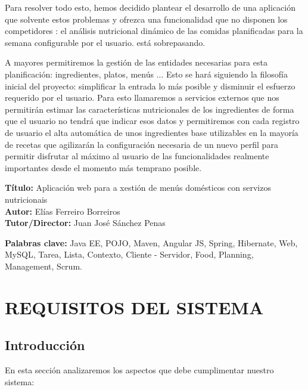 \documentclass[12pt, a4paper, twoside]{book}
\begin{document}
	Para resolver todo esto, hemos decidido plantear el desarrollo de una aplicación que solvente estos problemas y ofrezca una funcionalidad que no disponen los competidores : el análisis nutricional dinámico de las comidas planificadas para la semana configurable por el usuario. está sobrepasando.
	
	A mayores permitiremos la gestión de las entidades necesarias para esta planificación: ingredientes, platos, menús ... 
	Esto se hará siguiendo la filosofía inicial del proyecto: simplificar la entrada lo más posible y disminuir el esfuerzo requerido por el usuario. 
	Para esto llamaremos a servicios externos que nos permitirán estimar las características nutricionales de los ingredientes de forma que el usuario no tendrá que indicar esos datos y permitiremos con cada registro de usuario el alta automática de unos ingredientes base utilizables en la mayoría de recetas que agilizarán la configuración necesaria de un nuevo perfil para permitir disfrutar al máximo al usuario de las funcionalidades realmente importantes desde el momento más temprano posible.
	
	\clearpage
	
	\textbf{Título:} Aplicación web para a xestión de menús domésticos con servizos nutricionais
	\\
	\textbf{Autor:} Elías Ferreiro Borreiros
	\\
	\textbf{Tutor/Director:} Juan José Sánchez Penas
	
	
	\textbf{Palabras clave:} Java EE, POJO, Maven, Angular JS, Spring, Hibernate, Web, MySQL, Tarea, Lista, Contexto, Cliente - Servidor, Food, Planning, Management, Scrum. 
	
	
	\renewcommand{\contentsname}{Índice de contenidos}
	\renewcommand{\listfigurename}{Índice de figuras}
	\renewcommand{\listtablename}{Índice de tablas}
	
	\tableofcontents %
	
	\listoffigures %
	
	\listoftables %
	
	\clearpage
	
	\chapter{REQUISITOS DEL SISTEMA}
	\section{Introducción}
	En esta sección analizaremos los aspectos que debe cumplimentar nuestro sistema:
	
\end{document}

